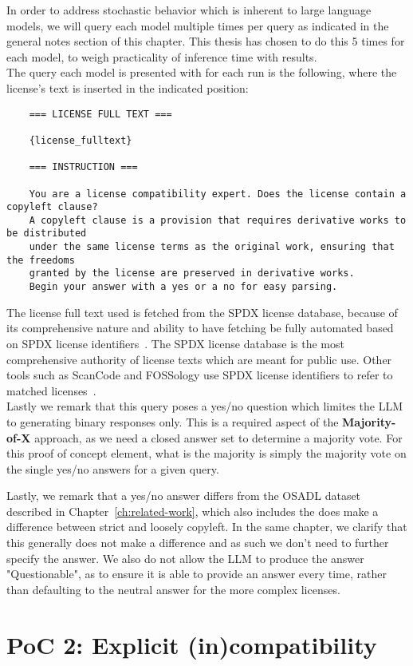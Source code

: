 In order to address stochastic behavior which is inherent to large language models, we will query each model multiple times per query as indicated in the general notes section of this chapter.   This thesis has chosen to do this 5 times for each model, to weigh practicality of inference time with results.\\

The query each model is presented with for each run is the following, where the license's text is inserted in the indicated position:

\begin{verbatim}
	=== LICENSE FULL TEXT ===
	
	{license_fulltext}
	
	=== INSTRUCTION ===
	
	You are a license compatibility expert. Does the license contain a copyleft clause?
	A copyleft clause is a provision that requires derivative works to be distributed
	under the same license terms as the original work, ensuring that the freedoms
	granted by the license are preserved in derivative works.
	Begin your answer with a yes or a no for easy parsing.
\end{verbatim}

The license full text used is fetched from the SPDX license database, because of its comprehensive nature and ability to have fetching be fully automated based on SPDX license identifiers~\cite{spdx-licenses}. The SPDX license database is the most comprehensive authority of license texts which are meant for public use. Other tools such as ScanCode and FOSSology use SPDX license identifiers to refer to matched licenses~\cite{scancode-home}\cite{fossology-home}. \\

Lastly we remark that this query poses a yes/no question which limites the LLM to generating binary responses only. This is a required aspect of the \textbf{Majority-of-X} approach, as we need a closed answer set to determine a majority vote. For this proof of concept element, what is the majority is simply the majority vote on the single yes/no answers for a given query.

Lastly, we remark that a yes/no answer differs from the OSADL dataset described in Chapter~\ref{ch:related-work}, which also includes the does make a difference between strict and loosely copyleft. In the same chapter, we clarify that this generally does not make a difference and as such we don't need to further specify the answer. We also do not allow the LLM to produce the answer "Questionable", as to ensure it is able to provide an answer every time, rather than defaulting to the neutral answer for the more complex licenses.

\section{PoC 2: Explicit (in)compatibility}